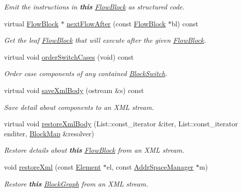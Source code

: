 \begin{DoxyCompactItemize}
\begin{DoxyCompactList}\small\item\em Emit the instructions in {\bfseries{this}} \mbox{\hyperlink{class_flow_block}{Flow\+Block}} as structured code. \end{DoxyCompactList}\item 
virtual \mbox{\hyperlink{class_flow_block}{Flow\+Block}} $\ast$ \mbox{\hyperlink{class_block_graph_aba0d42cf572bdcf2bca44d22fad971f6}{next\+Flow\+After}} (const \mbox{\hyperlink{class_flow_block}{Flow\+Block}} $\ast$bl) const
\begin{DoxyCompactList}\small\item\em Get the leaf \mbox{\hyperlink{class_flow_block}{Flow\+Block}} that will execute after the given \mbox{\hyperlink{class_flow_block}{Flow\+Block}}. \end{DoxyCompactList}\item 
virtual void \mbox{\hyperlink{class_block_graph_aaab258bf71213db644bb8e1764f81b1f}{order\+Switch\+Cases}} (void) const
\begin{DoxyCompactList}\small\item\em Order {\itshape case} components of any contained \mbox{\hyperlink{class_block_switch}{Block\+Switch}}. \end{DoxyCompactList}\item 
virtual void \mbox{\hyperlink{class_block_graph_a881076195239ce5c2e5c865f22714d03}{save\+Xml\+Body}} (ostream \&s) const
\begin{DoxyCompactList}\small\item\em Save detail about components to an X\+ML stream. \end{DoxyCompactList}\item 
virtual void \mbox{\hyperlink{class_block_graph_a7a1c54e577b11af83f2635f9c5ad0545}{restore\+Xml\+Body}} (List\+::const\+\_\+iterator \&iter, List\+::const\+\_\+iterator enditer, \mbox{\hyperlink{class_block_map}{Block\+Map}} \&resolver)
\begin{DoxyCompactList}\small\item\em Restore details about {\bfseries{this}} \mbox{\hyperlink{class_flow_block}{Flow\+Block}} from an X\+ML stream. \end{DoxyCompactList}\item 
void \mbox{\hyperlink{class_block_graph_a90d67a53a21174345f5f376c75ca6067}{restore\+Xml}} (const \mbox{\hyperlink{class_element}{Element}} $\ast$el, const \mbox{\hyperlink{class_addr_space_manager}{Addr\+Space\+Manager}} $\ast$m)
\begin{DoxyCompactList}\small\item\em Restore {\bfseries{this}} \mbox{\hyperlink{class_block_graph}{Block\+Graph}} from an X\+ML stream. \end{DoxyCompactList}\item 

\end{DoxyCompactItemize}
